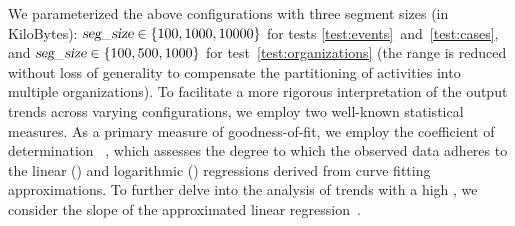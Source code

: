 %
We parameterized the above configurations with three segment sizes (in KiloBytes): $\textsl{seg\_size} \in \{100,1000,10000\}$ for tests \ref{test:events}~and~\ref{test:cases}, and $\textsl{seg\_size} \in \{100,500,1000\}$ for test~\ref{test:organizations} (the range is reduced without loss of generality to compensate the partitioning of activities into multiple organizations). To facilitate a more rigorous interpretation of the output trends across varying {\SegSize} configurations, we employ 
two well-known statistical measures. As a primary measure of goodness-of-fit, we employ the coefficient of determination {\RCoefficent}~\citep{barrett1974coefficient}, which assesses the degree to which the observed data adheres to the linear ({\Rlin}) and logarithmic ({\Rlog}) regressions derived from curve fitting approximations. To further delve into the analysis of trends with a high {\Rlin}, we consider the slope {\Slope} of the approximated linear regression~\citep{altman2015simplelinearregression}. 

